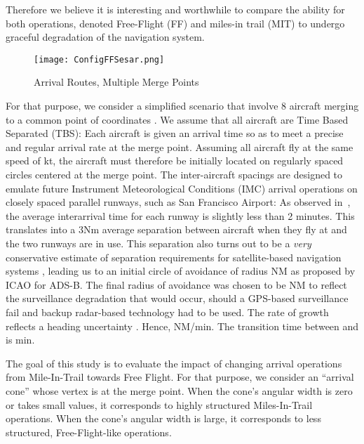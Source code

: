 \documentclass[a4paper, 10pt]{IEEEtran}
\begin{document}
Therefore we believe it is interesting and worthwhile to compare the ability for both operations, denoted Free-Flight (FF) and miles-in trail (MIT) to undergo graceful degradation of the navigation system.
\begin{figure}[ht]
\centering
    \texttt{[image: ConfigFFSesar.png]}
    \caption{Arrival Routes, Multiple Merge Points \cite{SESARconceptOfOperation}}
\label{fig:configArrivalSESAR}
\end{figure}
For that purpose, we consider a simplified scenario that involve 8 aircraft merging to a common point of coordinates . We assume that all aircraft are Time Based Separated (TBS): Each aircraft is given an arrival time so as to meet a precise and regular arrival rate at the merge point. Assuming all aircraft fly at the same speed of kt, the aircraft must therefore be initially located on regularly spaced circles centered at the merge point. The inter-aircraft spacings are designed to emulate future Instrument Meteorological
Conditions (IMC) arrival operations on closely spaced parallel runways, such as San Francisco Airport: As observed in~\cite{GarielDynamicIOmodel}, the average interarrival time for each runway is slightly less than 2 minutes. This translates into a 3Nm average separation between aircraft when they fly at  and the two runways are in use. This separation also turns out to be a {\em very} conservative estimate of separation requirements for satellite-based navigation systems \cite{powell2005}, leading us to an initial circle of avoidance of radius NM as proposed by ICAO for ADS-B\cite{ICAOADSBseparationStandards}. The final radius of avoidance was chosen to be NM to reflect the surveillance degradation that would occur, should a GPS-based surveillance fail and backup radar-based technology had to be used. The rate of growth reflects a heading uncertainty . Hence, NM/min. The transition time between  and  is min.

The goal of this study is to evaluate the impact of changing arrival operations from Mile-In-Trail towards Free Flight. For that purpose, we consider an ``arrival cone'' whose vertex is at the merge point. When the cone's angular width is zero or takes small values, it corresponds to highly structured Miles-In-Trail operations. When the cone's angular width is large, it corresponds to less structured, Free-Flight-like operations. 
\end{document}
